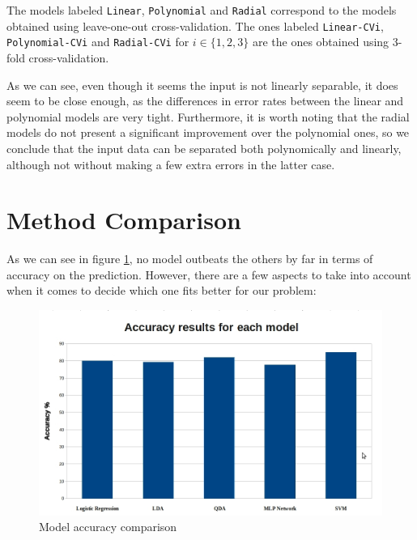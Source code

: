 \documentclass[english]{scrartcl}
\newcommand\ms[1]{\texttt{#1}}
\begin{document}
    The models labeled \ms{Linear}, \ms{Polynomial} and \ms{Radial} correspond to the models obtained using leave-one-out cross-validation. The ones labeled \ms{Linear-CVi}, \ms{Polynomial-CVi} and \ms{Radial-CVi} for $i \in \{1,2,3\}$ are the ones obtained using 3-fold cross-validation.
    
    As we can see, even though it seems the input is not linearly separable, it does seem to be close enough, as the differences in error rates between the linear and polynomial models are very tight. Furthermore, it is worth noting that the radial models do not present a significant improvement over the polynomial ones, so we conclude that the input data can be separated both polynomically and linearly, although not without making a few extra errors in the latter case.

\section{Method Comparison}

As we can see in figure \ref{fig:results}, no model outbeats the others by far in terms of
accuracy on the prediction. However, there are a few aspects to take into account when
it comes to decide which one fits better for our problem:

\begin{figure}[h!]
 
  \centering
    \includegraphics[width=1\textwidth]{results}
   \caption{Model accuracy comparison}
   \label{fig:results}
\end{figure}
\end{document}
